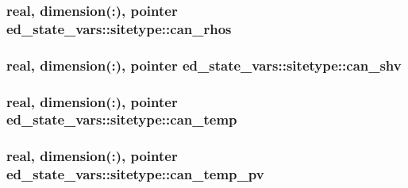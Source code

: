 \subsubsection[{\texorpdfstring{can\+\_\+rhos}{can_rhos}}]{\setlength{\rightskip}{0pt plus 5cm}real, dimension(\+:), pointer ed\+\_\+state\+\_\+vars\+::sitetype\+::can\+\_\+rhos}\hypertarget{structed__state__vars_1_1sitetype_abf2e58852c78435f8bbaf81bc7adf7a1}{}\label{structed__state__vars_1_1sitetype_abf2e58852c78435f8bbaf81bc7adf7a1}
\subsubsection[{\texorpdfstring{can\+\_\+shv}{can_shv}}]{\setlength{\rightskip}{0pt plus 5cm}real, dimension(\+:), pointer ed\+\_\+state\+\_\+vars\+::sitetype\+::can\+\_\+shv}\hypertarget{structed__state__vars_1_1sitetype_ad6203093c56962c316ae0a6da87b0b0e}{}\label{structed__state__vars_1_1sitetype_ad6203093c56962c316ae0a6da87b0b0e}
\subsubsection[{\texorpdfstring{can\+\_\+temp}{can_temp}}]{\setlength{\rightskip}{0pt plus 5cm}real, dimension(\+:), pointer ed\+\_\+state\+\_\+vars\+::sitetype\+::can\+\_\+temp}\hypertarget{structed__state__vars_1_1sitetype_a6c550197f38bf79d7443a6840bdcb5f0}{}\label{structed__state__vars_1_1sitetype_a6c550197f38bf79d7443a6840bdcb5f0}
\subsubsection[{\texorpdfstring{can\+\_\+temp\+\_\+pv}{can_temp_pv}}]{\setlength{\rightskip}{0pt plus 5cm}real, dimension(\+:), pointer ed\+\_\+state\+\_\+vars\+::sitetype\+::can\+\_\+temp\+\_\+pv}\hypertarget{structed__state__vars_1_1sitetype_a8647b435b1c4f59c6bc81a25172044b3}{}\label{structed__state__vars_1_1sitetype_a8647b435b1c4f59c6bc81a25172044b3}
